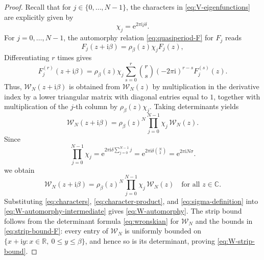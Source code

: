 \documentclass[11pt]{amsart}
\numberwithin{equation}{section}
\theoremstyle{definition}
\theoremstyle{remark}
\newcommand{\R}{\mathbb R}
\newcommand{\C}{\mathbb C}
\newcommand{\ii}{\mathrm i}
\newcommand{\e}{\mathrm e}
\newcommand{\cW}{\mathcal W}
\begin{document}
\begin{proof}
    Recall that for $j\in\{0,\ldots,N-1\}$, the characters in \eqref{eq:V-eigenfunctions} are explicitly given by
    \begin{equation}\label{eq:characters}
        \chi_j=\e^{2\pi\ii j\delta}.
    \end{equation}
    For $j=0,\ldots,N-1$, the automorphy relation \eqref{eq:quasiperiod-F} for $F_j$ reads
    \begin{equation}
        F_j(z+\ii\beta) = \rho_\beta(z)\chi_jF_j(z),
    \end{equation}
    Differentiating $r$ times gives
    \begin{equation} 
        F_j^{(r)}(z+\ii\beta) = \rho_\beta(z)\chi_j \sum_{s=0}^r \binom{r}{s}(-2\pi\ii)^{r-s}F_j^{(s)}(z).
    \end{equation}
    Thus, $\cW_N(z+\ii\beta)$ is obtained from $\cW_N(z)$ by multiplication in the derivative index by a lower triangular matrix with diagonal entries equal to $1$, together with multiplication of the $j$-th column by $\rho_\beta(z)\chi_j$. Taking determinants yields
    \begin{equation}
        \cW_N(z+\ii\beta) = \rho_\beta(z)^N \prod_{j=0}^{N-1}\chi_j \, \cW_N(z).
    \end{equation}
    Since
    \begin{equation}\label{eq:character-product}
        \prod_{j=0}^{N-1}\chi_j
        = \e^{2\pi\ii\delta\sum_{j=0}^{N-1}j}
        =\e^{2\pi\ii\delta\binom N2}
        =\e^{2\pi\ii N\sigma}.
    \end{equation}
    we obtain
    \begin{equation}\label{eq:W-automorphy-intermediate}
        \cW_N(z+\ii\beta)
        =\rho_\beta(z)^N\prod_{j=0}^{N-1}\chi_j\,\cW_N(z)
        \quad\text{for all }z\in\C.
    \end{equation}
    Substituting \eqref{eq:characters}, \eqref{eq:character-product}, and \eqref{eq:sigma-definition} into \eqref{eq:W-automorphy-intermediate} gives \eqref{eq:W-automorphy}. The strip bound follows from the determinant formula \eqref{eq:wronskian} for $\cW_N$ and the bounds in \eqref{eq:strip-bound-F}: every entry of $\cW_N$ is uniformly bounded on $\{x+\ii y:x\in\R,\ 0\leq y\leq\beta\}$, and hence so is its determinant, proving \eqref{eq:W-strip-bound}.
\end{proof}
\end{document}
